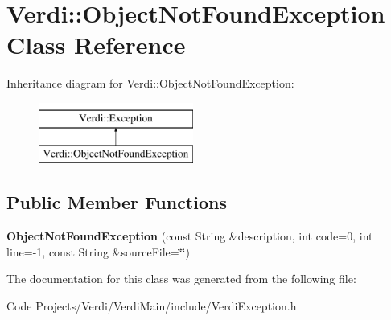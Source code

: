 \hypertarget{class_verdi_1_1_object_not_found_exception}{\section{\-Verdi\-:\-:\-Object\-Not\-Found\-Exception \-Class \-Reference}
\label{class_verdi_1_1_object_not_found_exception}
}
\-Inheritance diagram for \-Verdi\-:\-:\-Object\-Not\-Found\-Exception\-:\begin{figure}[H]
\begin{center}
\leavevmode
\includegraphics[height=2.000000cm]{class_verdi_1_1_object_not_found_exception}
\end{center}
\end{figure}
\subsection*{\-Public \-Member \-Functions}
\begin{DoxyCompactItemize}
\item 
\hypertarget{class_verdi_1_1_object_not_found_exception_acda47e89deba09b0d59751977899cd33}{{\bfseries \-Object\-Not\-Found\-Exception} (const \-String \&description, int code=0, int line=-\/1, const \-String \&source\-File=\char`\"{}\char`\"{})}\label{class_verdi_1_1_object_not_found_exception_acda47e89deba09b0d59751977899cd33}

\end{DoxyCompactItemize}


\-The documentation for this class was generated from the following file\-:\begin{DoxyCompactItemize}
\item 
\-Code Projects/\-Verdi/\-Verdi\-Main/include/\-Verdi\-Exception.\-h\end{DoxyCompactItemize}
